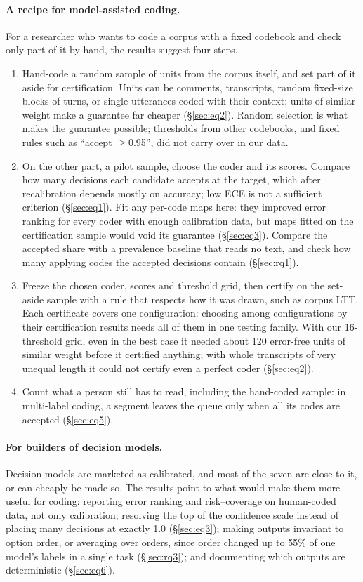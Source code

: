 \paragraph{A recipe for model-assisted coding.} For a researcher who wants to code a corpus with a fixed codebook and check
only part of it by hand, the results suggest four steps.
\begin{enumerate}
  \item Hand-code a random sample of units from the corpus itself, and set part of it aside for certification. Units can be
  comments, transcripts, random fixed-size blocks of turns, or single utterances coded with their context; units of similar
  weight make a guarantee far cheaper (\S\ref{sec:eq2}). Random selection is what makes the guarantee possible; thresholds
  from other codebooks, and fixed rules such as ``accept $\ge$0.95'', did not carry over in our data.
  \item On the other part, a pilot sample, choose the coder and its scores. Compare how many decisions each candidate
  accepts at the target, which after recalibration depends mostly on accuracy; low ECE is not a sufficient criterion
  (\S\ref{sec:eq1}). Fit any per-code maps here: they improved error ranking for every coder with enough calibration data,
  but maps fitted on the certification sample would void its guarantee (\S\ref{sec:eq3}). Compare the accepted share with a
  prevalence baseline that reads no text, and check how many applying codes the accepted decisions contain (\S\ref{sec:rq1}).
  \item Freeze the chosen coder, scores and threshold grid, then certify on the set-aside sample with a rule that respects how
  it was drawn, such as corpus LTT. Each certificate covers one configuration: choosing among configurations by their
  certification results needs all of them in one testing family. With our 16-threshold grid, even in the best case it needed
  about 120 error-free units of similar weight before it certified anything; with whole transcripts of very unequal length it could not certify even a perfect
  coder (\S\ref{sec:eq2}).
  \item Count what a person still has to read, including the hand-coded sample: in multi-label coding, a segment leaves the
  queue only when all its codes are accepted (\S\ref{sec:eq5}).
\end{enumerate}

\paragraph{For builders of decision models.} Decision models are marketed as calibrated, and most of the seven are close to
it, or can cheaply be made so. The results point to what would make them more useful for coding: reporting error ranking and
risk--coverage on human-coded data, not only calibration; resolving the top of the confidence scale instead of placing many
decisions at exactly 1.0 (\S\ref{sec:eq3}); making outputs invariant to option order, or averaging over orders, since order
changed up to 55\% of one model's labels in a single task (\S\ref{sec:rq3}); and documenting which outputs are deterministic
(\S\ref{sec:eq6}).

